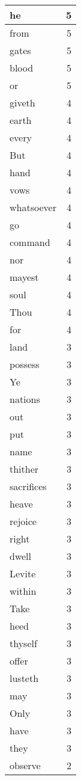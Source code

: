 \begin{center}
\begin{longtable}{l|r}
he & 5 \\ \hline
from & 5 \\ \hline
gates & 5 \\ \hline
blood & 5 \\ \hline
or & 5 \\ \hline
giveth & 4 \\ \hline
earth & 4 \\ \hline
every & 4 \\ \hline
But & 4 \\ \hline
hand & 4 \\ \hline
vows & 4 \\ \hline
whatsoever & 4 \\ \hline
go & 4 \\ \hline
command & 4 \\ \hline
nor & 4 \\ \hline
mayest & 4 \\ \hline
soul & 4 \\ \hline
Thou & 4 \\ \hline
for & 4 \\ \hline
land & 3 \\ \hline
possess & 3 \\ \hline
Ye & 3 \\ \hline
nations & 3 \\ \hline
out & 3 \\ \hline
put & 3 \\ \hline
name & 3 \\ \hline
thither & 3 \\ \hline
sacrifices & 3 \\ \hline
heave & 3 \\ \hline
rejoice & 3 \\ \hline
right & 3 \\ \hline
dwell & 3 \\ \hline
Levite & 3 \\ \hline
within & 3 \\ \hline
Take & 3 \\ \hline
heed & 3 \\ \hline
thyself & 3 \\ \hline
offer & 3 \\ \hline
lusteth & 3 \\ \hline
may & 3 \\ \hline
Only & 3 \\ \hline
have & 3 \\ \hline
they & 3 \\ \hline
observe & 2 \\ \hline

\end{longtable}
\end{center}
